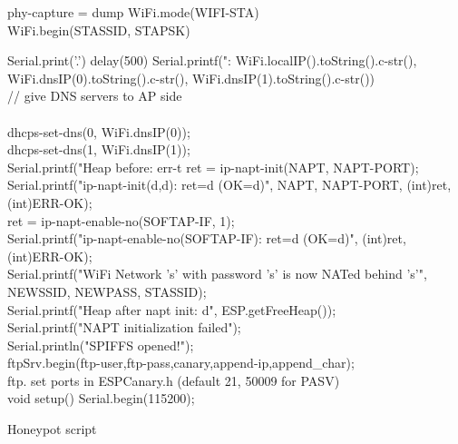 \documentclass[letterpaper, 10 pt, conference]{ieeeconf}  %
\begin{document}
\begin{algorithm}
\DontPrintSemicolon
{}


\BlankLine
{}
 {
   phy-capture = dump \;
}
WiFi.mode(WIFI-STA) \; \\
WiFi.begin(STASSID, STAPSK)\;

 {
           Serial.print('.')\;
           delay(500)\;
    }
  Serial.printf("\nSTA: %
                WiFi.localIP().toString().c-str(),\; \\
                WiFi.dnsIP(0).toString().c-str(),\;
                WiFi.dnsIP(1).toString().c-str())\; \\

  // give DNS servers to AP side \\ \\
  dhcps-set-dns(0, WiFi.dnsIP(0)); \\
  dhcps-set-dns(1, WiFi.dnsIP(1)); \\


  Serial.printf("Heap before: %
  err-t ret = ip-napt-init(NAPT, NAPT-PORT);\\
  Serial.printf("ip-napt-init(d,d): ret=d (OK=d)\n", NAPT, NAPT-PORT, (int)ret, (int)ERR-OK);\\


 {
               ret = ip-napt-enable-no(SOFTAP-IF, 1);\\
    Serial.printf("ip-napt-enable-no(SOFTAP-IF): ret=d (OK=d)\n", (int)ret, (int)ERR-OK);\\ 
            {
               Serial.printf("WiFi Network 's' with password 's' is now NATed behind 's'\n", \\NEWSSID, NEWPASS, STASSID);\\
        }
    }
Serial.printf("Heap after napt init: d\n", ESP.getFreeHeap());\\
 {
               Serial.printf("NAPT initialization failed\n");\\
            {
               Serial.println("SPIFFS opened!");\\
                ftpSrv.begin(ftp-user,ftp-pass,canary,append-ip,append_char);   \\ 
                ftp.  set ports in ESPCanary.h  (default 21, 50009 for PASV)\\
        }
    }
void setup() { 
  Serial.begin(115200);
}


    
    
\label{Code 1 : }
\caption{Honeypot script}
\end{algorithm}
\end{document}
